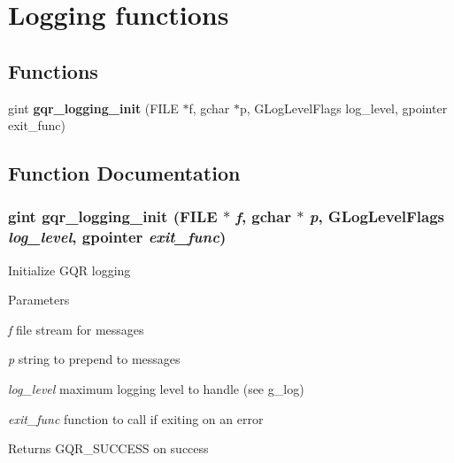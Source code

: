 \section{Logging functions}
\label{group__logging}
\subsection*{Functions}
\begin{DoxyCompactItemize}
\item 
gint {\bf gqr\_\-logging\_\-init} (FILE $\ast$f, gchar $\ast$p, GLogLevelFlags log\_\-level, gpointer exit\_\-func)
\end{DoxyCompactItemize}


\subsection{Function Documentation}
\subsubsection[{gqr\_\-logging\_\-init}]{\setlength{\rightskip}{0pt plus 5cm}gint gqr\_\-logging\_\-init (FILE $\ast$ {\em f}, \/  gchar $\ast$ {\em p}, \/  GLogLevelFlags {\em log\_\-level}, \/  gpointer {\em exit\_\-func})}\label{group__logging_ga0a970a3529b0ffec2b50de2c4a7c9f68}
Initialize GQR logging


\begin{DoxyParams}{Parameters}
\item[{\em f}]file stream for messages \item[{\em p}]string to prepend to messages \item[{\em log\_\-level}]maximum logging level to handle (see g\_\-log) \item[{\em exit\_\-func}]function to call if exiting on an error\end{DoxyParams}
\begin{DoxyReturn}{Returns}
GQR\_\-SUCCESS on success 
\end{DoxyReturn}
